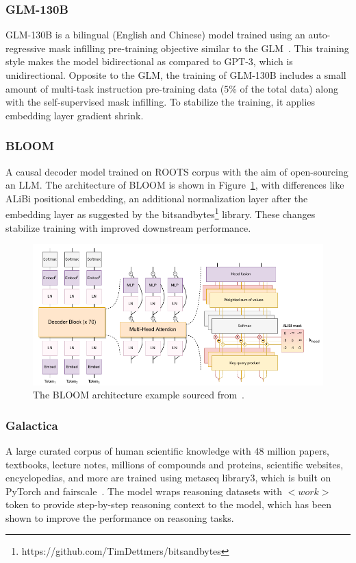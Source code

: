 \subsubsection{GLM-130B~\cite{GLM-130B}}
GLM-130B is a bilingual (English and Chinese) model trained using an auto-regressive mask infilling pre-training objective similar to the GLM~\cite{GLM}. This training style makes the model bidirectional as compared to GPT-3, which is unidirectional. Opposite to the GLM, the training of GLM-130B includes a small amount of multi-task instruction pre-training data (5\% of the total data) along with the self-supervised mask infilling. To stabilize the training, it applies embedding layer gradient shrink. 

\subsubsection{BLOOM~\cite{BLOOM}}
A causal decoder model trained on ROOTS corpus with the aim of open-sourcing an LLM. The architecture of BLOOM is shown in Figure~\ref{bloom_image}, with differences like ALiBi positional embedding, an additional normalization layer after the embedding layer as suggested by the bitsandbytes\footnote{https://github.com/TimDettmers/bitsandbytes} library. These changes stabilize training with improved downstream performance. 

\begin{figure}[tbp]
\centering
\includegraphics[width=1\columnwidth]{Figure/BLOOM.png}
\caption{The BLOOM architecture example sourced from~\cite{BLOOM}.}
\label{bloom_image}
\end{figure}

\subsubsection{Galactica~\cite{galactica}}
A large curated corpus of human scientific knowledge with 48 million papers, textbooks, lecture notes, millions of compounds and proteins, scientific websites, encyclopedias, and more are trained using metaseq library3, which is built on PyTorch and fairscale~\cite{fairscale}. The model wraps reasoning datasets with $<work>$ token to provide step-by-step reasoning context to the model, which has been shown to improve the performance on reasoning tasks.

